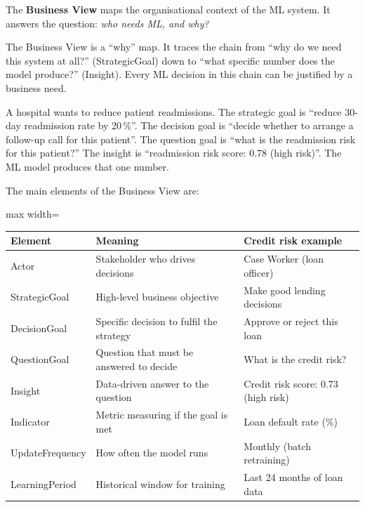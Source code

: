 \documentclass[a4paper,11pt]{article}
\newcommand{\vocab}[1]{\textbf{\color{navy}#1}}
\begin{document}
The \vocab{Business View} maps the organisational context of the ML system.
It answers the question: \emph{who needs ML, and why?}

\begin{intuition}
The Business View is a ``why'' map.
It traces the chain from ``why do we need this system at all?'' (StrategicGoal)
down to ``what specific number does the model produce?'' (Insight).
Every ML decision in this chain can be justified by a business need.
\end{intuition}

\begin{everyday}
A hospital wants to reduce patient readmissions.
The strategic goal is ``reduce 30-day readmission rate by 20\,\%''.
The decision goal is ``decide whether to arrange a follow-up call for this patient''.
The question goal is ``what is the readmission risk for this patient?''
The insight is ``readmission risk score: 0.78 (high risk)''.
The ML model produces that one number.
\end{everyday}

The main elements of the Business View are:

\begin{center}
\begin{adjustbox}{max width=\linewidth}
\begin{tabular}{@{}lll@{}}
\toprule
\textbf{Element} & \textbf{Meaning} & \textbf{Credit risk example} \\
\midrule
Actor & Stakeholder who drives decisions & Case Worker (loan officer) \\
StrategicGoal & High-level business objective & Make good lending decisions \\
DecisionGoal & Specific decision to fulfil the strategy & Approve or reject this loan \\
QuestionGoal & Question that must be answered to decide & What is the credit risk? \\
Insight & Data-driven answer to the question & Credit risk score: 0.73 (high risk) \\
Indicator & Metric measuring if the goal is met & Loan default rate (\%) \\
UpdateFrequency & How often the model runs & Monthly (batch retraining) \\
LearningPeriod & Historical window for training & Last 24 months of loan data \\
\bottomrule
\end{tabular}
\end{adjustbox}
\end{center}
\end{document}
